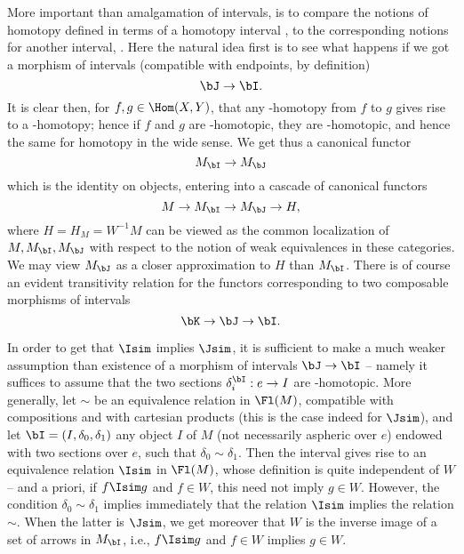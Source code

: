 More important than amalgamation of intervals, is to compare the
notions of homotopy defined in terms of a homotopy interval \bI, to
the corresponding notions for another interval, \bJ. Here the natural
idea first is to see what happens if we got a morphism of intervals
(compatible with endpoints, by definition)
\[ \bJ\to\bI.\]
It is clear then, for $f,g\in\Hom(X,Y)$, that any
\bI-homotopy from $f$ to $g$ gives rise to a \bJ-homotopy; hence if
$f$ and $g$ are \bI-homotopic, they are \bJ-homotopic, and hence the
same for homotopy in the wide sense. We get thus a canonical functor
\[ M_\bI \to M_\bJ\]
which is the identity on objects, entering into a cascade of canonical
functors
\[ M \to M_\bI \to M_\bJ \to H,\]
where $H=H_M=W^{-1}M$ can be viewed as the common localization of $M,
M_\bI, M_\bJ$ with respect to the notion of weak equivalences in these
categories. We may view $M_\bJ$ as a closer approximation to $H$ than
$M_\bI$. There is of course an evident transitivity relation for the
functors corresponding to two composable morphisms of intervals
\[ \bK\to\bJ\to\bI.\]
\begin{remark}
  In order to get that $\Isim$ implies $\Jsim$, it is sufficient to
  make a much weaker assumption than existence of a morphism of
  intervals $\bJ\to\bI$ -- namely it suffices to assume that the two
  sections $\delta_i^\bI: e\to I$ are \bJ-homotopic. More generally,
  let $\sim$ be an equivalence relation in $\Fl(M)$, compatible with
  compositions and with cartesian products (this is the case indeed
  for $\Jsim$), and let $\bI=(I,\delta_0,\delta_1)$ any object $I$ of
  $M$ (not necessarily aspheric over $e$) endowed with two sections
  over $e$, such that $\delta_0\sim\delta_1$. Then the interval \bI{}
  gives rise to an equivalence relation $\Isim$ in $\Fl(M)$, whose
  definition is quite independent of $W$ -- and a priori, if $f\Isim
  g$ and $f\in W$, this need not imply $g\in W$. However, the
  condition $\delta_0\sim\delta_1$ implies immediately that the
  relation $\Isim$ implies the relation $\sim$. When the latter is
  $\Jsim$, we get moreover that $W$ is the inverse image of a set of
  arrows in $M_\bI$, i.e., $f\Isim g$ and $f\in W$ implies $g\in W$.
\end{remark}

